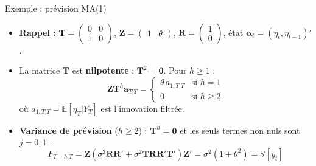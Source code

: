 \documentclass[11pt,aspectratio=169]{beamer}
\newcommand{\E}{\mathbb{E}}
\newcommand{\Var}{\mathbb{V}}
\begin{document}
\begin{frame}{Exemple : prévision MA(1)}

\begin{itemize}

\item \textbf{Rappel :} $\bm{T} = \begin{pmatrix} 0 & 0 \\ 1 & 0 \end{pmatrix}$, $\bm{Z} = \begin{pmatrix} 1 & \theta \end{pmatrix}$, $\bm{R} = \begin{pmatrix} 1 \\ 0 \end{pmatrix}$, état $\bm{\alpha}_t = (\eta_t, \eta_{t-1})'$.\newline

\item La matrice $\bm{T}$ est \textbf{nilpotente} : $\bm{T}^2 = \bm{0}$. Pour $h \geq 1$ :
  \[
  \bm{Z}\bm{T}^h \bm{a}_{T|T} = \begin{cases} \theta\, a_{1,T|T} & \text{si } h = 1 \\ 0 & \text{si } h \geq 2 \end{cases}
  \]
  où $a_{1,T|T} = \E[\eta_T | Y_T]$ est l'innovation filtrée.\newline

\item \textbf{Variance de prévision} ($h \geq 2$) : $\bm{T}^h = \bm{0}$ et les seuls termes non nuls sont $j = 0, 1$ :
  \[
  F_{T+h|T} = \bm{Z}\!\left(\sigma^2 \bm{R}\bm{R}' + \sigma^2 \bm{T}\bm{R}\bm{R}'\bm{T}'\right)\!\bm{Z}' = \sigma^2(1 + \theta^2) = \Var[y_t]
  \]

\end{itemize}

\end{frame}
\end{document}

